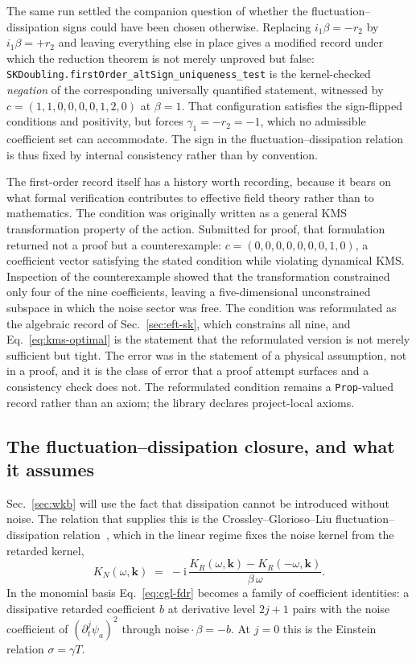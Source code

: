 \documentclass[aps,prd,reprint,nofootinbib,superscriptaddress]{revtex4-2}
\begin{document}
The same run settled the companion question of whether the
fluctuation--dissipation signs could have been chosen otherwise.
Replacing $i_1\beta = -r_2$ by $i_1\beta = +r_2$ and leaving everything
else in place gives a modified record under which the reduction theorem
is not merely unproved but false:
\texttt{SKDoubling.firstOrder\_altSign\_uniqueness\_test} is the
kernel-checked \emph{negation} of the corresponding universally
quantified statement, witnessed by
$c = (1,1,0,0,0,0,1,2,0)$ at $\beta = 1$. That configuration satisfies
the sign-flipped conditions and positivity, but forces
$\gamma_1 = -r_2 = -1$, which no admissible coefficient set can
accommodate. The sign in the fluctuation--dissipation relation is thus
fixed by internal consistency rather than by convention.

The first-order record itself has a history worth recording, because it
bears on what formal verification contributes to effective field theory
rather than to mathematics. The condition was originally written as a
general KMS transformation property of the action. Submitted for
proof, that formulation returned not a proof but a counterexample:
$c = (0,0,0,0,0,0,0,1,0)$, a coefficient vector satisfying the stated
condition while violating dynamical KMS. Inspection of the
counterexample showed that the transformation constrained only four of
the nine coefficients, leaving a five-dimensional unconstrained
subspace in which the noise sector was free. The condition was
reformulated as the algebraic record of Sec.~\ref{sec:eft-sk}, which
constrains all nine, and Eq.~\eqref{eq:kms-optimal} is the statement
that the reformulated version is not merely sufficient but tight. The
error was in the statement of a physical assumption, not in a proof,
and it is the class of error that a proof attempt surfaces and a
consistency check does not. The reformulated condition remains a
\texttt{Prop}-valued record rather than an axiom; the library declares
\axiomcount{} project-local axioms.

\subsection{The fluctuation--dissipation closure, and what it assumes}
\label{sec:higher-fdr}

Sec.~\ref{sec:wkb} will use the fact that dissipation cannot be
introduced without noise. The relation that supplies this is the
Crossley--Glorioso--Liu fluctuation--dissipation
relation~\cite{CGL2017a,Crossley2017II}, which in the linear regime
fixes the noise kernel from the retarded kernel,
\begin{equation}
K_N(\omega, \mathbf{k})
  \;=\; -\mathrm{i}\,
  \frac{K_R(\omega, \mathbf{k}) - K_R(-\omega, \mathbf{k})}{\beta\,\omega} .
\label{eq:cgl-fdr}
\end{equation}
In the monomial basis Eq.~\eqref{eq:cgl-fdr} becomes a family of
coefficient identities: a dissipative retarded coefficient $b$ at
derivative level $2j+1$ pairs with the noise coefficient of
$(\partial_t^j \psi_a)^2$ through $\mathrm{noise} \cdot \beta = -b$. At
$j = 0$ this is the Einstein relation $\sigma = \gamma T$.
\end{document}
